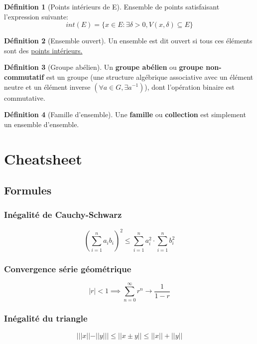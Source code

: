 \documentclass[12pt]{book}
\newcommand\todo[1]{\phantom{#1}}
\theoremstyle{definition}
\newtheorem{definition}{Définition}[section]
\begin{document}
\begin{definition}[Points intérieurs de E]
    \label{def:point_int}
    Ensemble de points satisfaisant l'expression
    suivante: $$int(E) = \{ x \in E : \exists \delta > 0, V(x, \delta) \subseteq E \} $$
\end{definition}

\begin{definition}[Ensemble ouvert]
    \label{def:ensemble_ouvert}
    Un ensemble est dit ouvert si tous ces éléments sont des \hyperref[def:point_int]{points intérieurs.}
\end{definition}

\begin{definition}[Groupe abélien]
    \label{def:groupe_abelien}
    Un \textbf{groupe abélien} ou \textbf{groupe non-commutatif} est un groupe
    (une structure algébrique associative avec un élément neutre et un élément inverse $(\forall a \in G, \exists a^{-1})$), 
    dont l'opération binaire est commutative.
\end{definition}

\begin{definition}[Famille d'ensemble]
    \label{def:famille}
    Une \textbf{famille} ou \textbf{collection} est simplement un ensemble d'ensemble.
\end{definition}
\todo{Add reference}

\chapter{Cheatsheet}
\section{Formules}
\subsection{Inégalité de Cauchy-Schwarz}
$$(\sum_{i=1}^{n} a_ib_i)^2 \leq \sum_{i=1}^{n} a_i^2 \cdot \sum_{i=1}^{n} b_i ^ 2$$ 
\subsection{Convergence série géométrique}
$$|r| < 1 \implies \sum_{n=0}^{\infty} r^n \to \frac{1}{1 - r} $$
\subsection{Inégalité du triangle}
$$| ||x|| - ||y|| | \leq ||x \pm y|| \leq ||x|| + ||y|| $$
\end{document}
